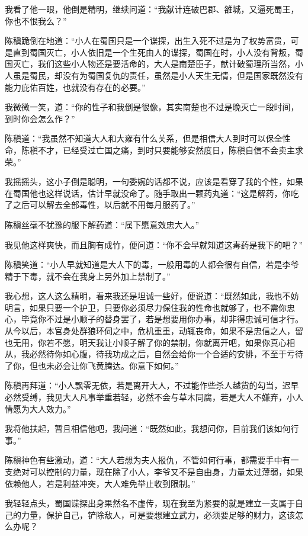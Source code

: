 我看了他一眼，他倒是精明，继续问道：“我献计连破巴郡、雒城，又逼死蜀王，你也不恨我么？”

陈稹跪倒在地道：“小人在蜀国只是一个谍探，出生入死不过是为了权势富贵，可是直到蜀国灭亡，小人依旧是一个生死由人的谍探，蜀国在时，小人没有背叛，蜀国灭亡，我们这些小人物还是要活命的，大人是南楚臣子，献计破蜀理所当然，小人虽是蜀民，却没有为蜀国复仇的责任，虽然是小人天生无情，但是国家既然没有能力庇佑百姓，也就没有存在的必要。”

我微微一笑，道：“你的性子和我倒是很像，其实南楚也不过是晚灭亡一段时间，到时你会怎么作？”

陈稹道：“我虽然不知道大人和大雍有什么关系，但是相信大人到时可以保全性命，陈稹不才，已经受过亡国之痛，到时只要能够安然度日，陈稹自信不会卖主求荣。”

我摇摇头，这小子倒是聪明，一句委婉的话都不说，应该是看穿了我的个性，如果在蜀国他也这样说话，估计早就没命了。随手取出一颗药丸道：“这是解药，你吃了之后可以解去全部毒性，以后就不用每月服药了。”

陈稹丝毫不犹豫的服下解药道：“属下愿意效忠大人。”

我见他这样爽快，而且胸有成竹，便问道：“你不会早就知道这毒药是我下的吧？”

陈稹笑道：“小人早就知道是大人下的毒，一般用毒的人都会很有自信，若是李爷精于下毒，就不会在我身上另外加上禁制了。”

我心想，这人这么精明，看来我还是坦诚一些好，便说道：“既然如此，我也不妨明言，如果只要一个护卫，只要你必须尽力保住我的性命也就够了，也不需你忠心，毕竟你不过是小顺子的替身罢了，若是想要用你办事，却非得忠诚可信才行。从今以后，本官身处群狼环伺之中，危机重重，动辄丧命，如果不是忠信之人，留也无用，你若不愿，明天我让小顺子解了你的禁制，你就离开吧，如果你真心相从，我必然待你如心腹，待我功成之后，自然会给你一个合适的安排，不至于亏待了你，但也未必会让你飞黄腾达。你意下如何。”

陈稹再拜道：“小人飘零无依，若是离开大人，不过能作些杀人越货的勾当，迟早必然受缚，我见大人凡事举重若轻，必然不会与草木同腐，若是大人不嫌弃，小人情愿为大人效力。”

我将他扶起，暂且相信他吧，我问道：“既然如此，我想问你，目前我们该如何行事。”

陈稹神色有些激动，道：“大人若想为夫人报仇，不管如何行事，都需要手中有一支绝对可以控制的力量，现在除了小人，李爷又不是自由身，力量太过薄弱，如果依赖他人，若是利益冲突，大人难免举止收到限制。”

我轻轻点头，蜀国谍探出身果然名不虚传，现在我至为紧要的就是建立一支属于自己的力量，保护自己，铲除敌人，可是要想建立武力，必须要足够的财力，这该怎么办呢？

